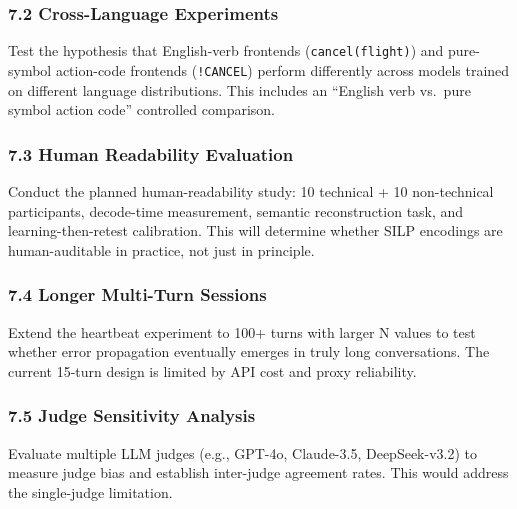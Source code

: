 \subsubsection{7.2 Cross-Language Experiments}\label{cross-language-experiments}



Test the hypothesis that English-verb frontends (\texttt{cancel(flight)}) and pure-symbol action-code frontends (\texttt{!CANCEL}) perform differently across models trained on different language distributions. This includes an ``English verb vs.~pure symbol action code'' controlled comparison.



\subsubsection{7.3 Human Readability Evaluation}\label{human-readability-evaluation}



Conduct the planned human-readability study: 10 technical + 10 non-technical participants, decode-time measurement, semantic reconstruction task, and learning-then-retest calibration. This will determine whether SILP encodings are human-auditable in practice, not just in principle.



\subsubsection{7.4 Longer Multi-Turn Sessions}\label{longer-multi-turn-sessions}



Extend the heartbeat experiment to 100+ turns with larger N values to test whether error propagation eventually emerges in truly long conversations. The current 15-turn design is limited by API cost and proxy reliability.



\subsubsection{7.5 Judge Sensitivity Analysis}\label{judge-sensitivity-analysis}



Evaluate multiple LLM judges (e.g., GPT-4o, Claude-3.5, DeepSeek-v3.2) to measure judge bias and establish inter-judge agreement rates. This would address the single-judge limitation.



